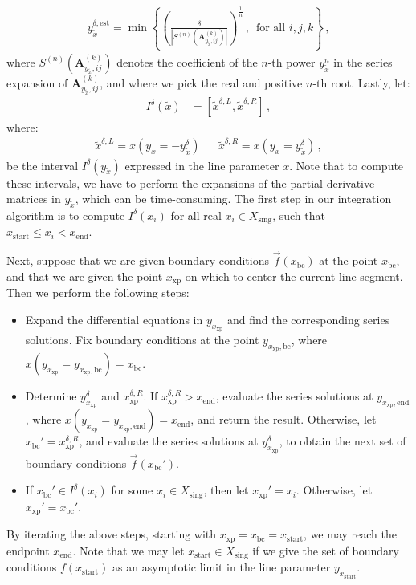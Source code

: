 \documentclass{article}
\begin{document}
\begin{align}
    y^{\delta,\text{est}}_{\tilde{x}} = \min \left\{ \left(\frac{\delta}{\left|S^{(n)} \left(\mathbf{A}_{y_{\tilde{x}},ij}^{(k)}\right)\right|}\right)^{\frac{1}{n}}\,,\,  \text{ for all }i,j,k\right\}\,,
\end{align}
where $S^{(n)} \left(\mathbf{A}_{y_{\tilde{x}},ij}^{(k)}\right)$ denotes the coefficient of the $n$-th power $y_{\tilde{x}}^n$ in the series expansion of $\mathbf{A}_{y_{\tilde{x}},ij}^{(k)}$, and where we pick the real and positive $n$-th root. Lastly, let:
\begin{align}
    \label{eq:intervx}
    I^\delta(\tilde{x}) &= [\tilde{x}^{\delta,L}, \tilde{x}^{\delta,R}]\,,
\end{align}
where:
\begin{align}
    \tilde{x}^{\delta,L} = x(y_{\tilde{x}} = -y_{\tilde{x}}^\delta) && \tilde{x}^{\delta,R} = x(y_{\tilde{x}} = y_{\tilde{x}}^\delta)\,,
\end{align}
be the interval $I^\delta(y_{\tilde{x}})$ expressed in the line parameter $x$. Note that to compute these intervals, we have to perform the expansions of the partial derivative matrices in $y_{\tilde{x}}$, which can be time-consuming. The first step in our integration algorithm is to compute $I^\delta(x_i)$ for all real $x_i \in X_{\text{sing}}$, such that $x_\text{start} \leq x_i < x_\text{end}$.

Next, suppose that we are given boundary conditions $\vec{f}(x_{\text{bc}})$ at the point $x_{\text{bc}}$, and that we are given the point $x_\text{xp}$ on which to center the current line segment. Then we perform the following steps:
\begin{itemize}
    \item[1.] Expand the differential equations in $y_{x_{\text{xp}}}$ and find the corresponding series solutions. Fix boundary conditions at the point $y_{x_{\text{xp}},\text{bc}}$, where $x(y_{x_{\text{xp}}} = y_{x_{\text{xp}},\text{bc}}) = x_{\text{bc}}$.
    \item[2.] Determine $y^\delta_{x_{\text{xp}}}$ and $x_{\text{xp}}^{\delta,R}$. If $x_{\text{xp}}^{\delta,R} > x_{\text{end}}$, evaluate the series solutions at $y_{x_{\text{xp}},\text{end}}$, where $x(y_{x_{\text{xp}}} = y_{x_{\text{xp}},\text{end}}) = x_{\text{end}}$, and return the result. Otherwise, let $x_{\text{bc}}' = x_{\text{xp}}^{\delta,R}$, and evaluate the series solutions at $y^\delta_{x_{\text{xp}}}$, to obtain the next set of boundary conditions $\vec{f}(x_{\text{bc}}')$.
    \item[3.] If $x_{\text{bc}}' \in I^\delta(x_i)$ for some $x_i \in X_{\text{sing}}$, then let $x_{\text{xp}}' = x_i$. Otherwise, let $x_{\text{xp}}' = x_{\text{bc}}'$.
\end{itemize}
By iterating the above steps, starting with $x_{\text{xp}} = x_{\text{bc}} = x_{\text{start}}$, we may reach the endpoint $x_{\text{end}}$. Note that we may let $x_{\text{start}}\in X_\text{sing}$ if we give the set of boundary conditions $f(x_{\text{start}})$ as an asymptotic limit in the line parameter $y_{x_{\text{start}}}$.
\end{document}
